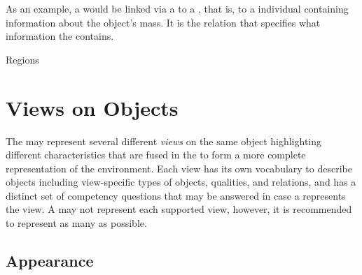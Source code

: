 As an example, a  would be linked via a  to a , that is, to a  individual containing information about the object's mass. It is the relation  that specifies what information the  contains.

\begin{ODP}{Regions}
\end{ODP}

\section{Views on Objects}
\label{sec:background:views}

The \neembak may represent several different \emph{views} on the same object highlighting different characteristics that are fused in the \neembak to form a more complete representation of the environment.
Each view has its own vocabulary to describe objects including view-specific types of objects, qualities, and relations, and has a distinct set of competency questions that may be answered in case a \neem represents the view.
A \neem may not represent each supported view, however, it is recommended to represent as many as possible.

\subsection{Appearance}


